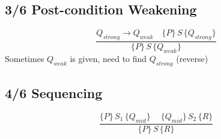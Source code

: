 {\subsection*{3/6 Post-condition Weakening}
\begin{displaymath}
  \frac{Q_{strong}\rightarrow Q_{weak} \quad \{P\}\,S\,\{Q_{strong}\} } {\{P\}\,S\,\{Q_{weak}\}}
\end{displaymath}
Sometimes $Q_{weak}$ is given, need to find $Q_{strong}$ (reverse)
\subsection*{4/6 Sequencing}
\begin{displaymath}
  \frac{\{P\}\,S_{1}\,\{ Q_{mid}\}\ \quad \{Q_{mid}\}\,S_{2}\,\{R\}}{\{P\}\,S\,\{R\}}
\end{displaymath}
}
